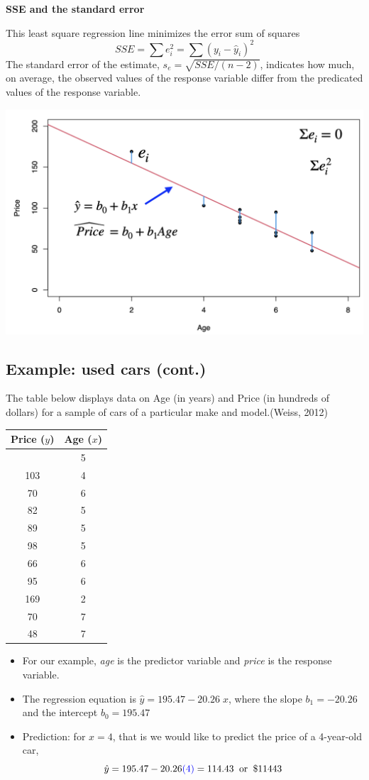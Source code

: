 \documentclass[
]{article}
\begin{document}
\textbf{SSE and the standard error}

This least square regression line minimizes the error sum of squares
\[SSE=\sum e^2_i =\sum (y_i-\hat{y}_i)^2\] The standard error of the
estimate, \(s_e=\sqrt{SSE/(n-2)}\), indicates how much, on average, the
observed values of the response variable differ from the predicated
values of the response variable.

\begin{center}\includegraphics[width=0.6\linewidth,height=0.6\textheight]{figures/leastsq1} \end{center}

\hypertarget{example-used-cars-cont.-1}{%
\subsection{Example: used cars
(cont.)}\label{example-used-cars-cont.-1}}

The table below displays data on Age (in years) and Price (in hundreds
of dollars) for a sample of cars of a particular make and model.(Weiss,
2012)

\begin{longtable}[]{@{}cc@{}}
\toprule\noalign{}
Price (\(y\)) & Age (\(x\)) \\
\midrule\noalign{}
\endhead
\bottomrule\noalign{}
\endlastfoot
85 & 5 \\
103 & 4 \\
70 & 6 \\
82 & 5 \\
89 & 5 \\
98 & 5 \\
66 & 6 \\
95 & 6 \\
169 & 2 \\
70 & 7 \\
48 & 7 \\
\end{longtable}

\begin{itemize}
\item
  For our example, \emph{age} is the predictor variable and \emph{price}
  is the response variable.
\item
  The regression equation is \(\hat{y}=195.47-20.26\;x\), where the
  slope \(b_1=-20.26\) and the intercept \(b_0=195.47\)
\item
  Prediction: for \(x = 4\), that is we would like to predict the price
  of a 4-year-old car,
  \[\hat{y}=195.47-20.26 {\color{blue}(4)}= 114.43 \;\;\text{or}\;\; \$ 11443\]
\end{itemize}
\end{document}
